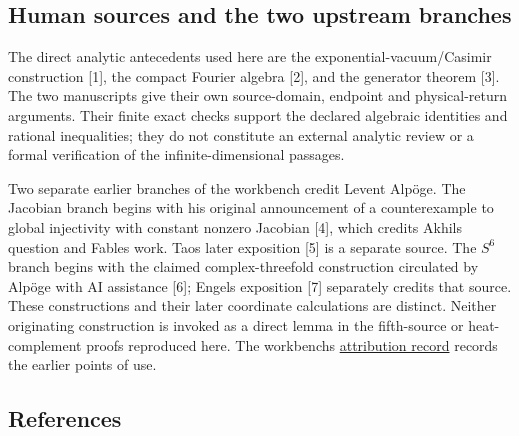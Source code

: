 \documentclass[11pt,a4paper]{article}
\begin{document}
\subsection{Human sources and the two upstream
branches}\label{human-sources-and-the-two-upstream-branches}

The direct analytic antecedents used here are the
{e\allowbreak{}x\allowbreak{}p\allowbreak{}o\allowbreak{}n\allowbreak{}e\allowbreak{}n\allowbreak{}t\allowbreak{}i\allowbreak{}a\allowbreak{}l\allowbreak{}-\allowbreak{}v\allowbreak{}a\allowbreak{}c\allowbreak{}u\allowbreak{}u\allowbreak{}m\allowbreak{}/\allowbreak{}C\allowbreak{}a\allowbreak{}s\allowbreak{}i\allowbreak{}m\allowbreak{}i\allowbreak{}r\allowbreak{}}
construction {[}1{]}, the compact Fourier algebra {[}2{]}, and the
generator theorem {[}3{]}. The two manuscripts give their own
source-domain, endpoint and physical-return arguments. Their finite
exact checks support the declared algebraic identities and rational
inequalities; they do not constitute an external analytic review or a
formal verification of the infinite-dimensional passages.

Two separate earlier branches of the workbench credit Levent Alpöge. The
Jacobian branch begins with his original announcement of a
counterexample to global injectivity with constant nonzero Jacobian
{[}4{]}, which credits Akhil\textquotesingle s question and
Fable\textquotesingle s work. Tao\textquotesingle s later exposition
{[}5{]} is a separate source. The \(S^6\) branch begins with the claimed
complex-threefold construction circulated by Alpöge with AI assistance
{[}6{]}; Engel\textquotesingle s exposition {[}7{]} separately credits
that source. These constructions and their later coordinate calculations
are distinct. Neither originating construction is invoked as a direct
lemma in the fifth-source or heat-complement proofs reproduced here. The
workbench\textquotesingle s
\href{https://github.com/KokunoYumeto/yang-mills-interacting-workbench/blob/main/ATTRIBUTION.md}{attribution
record} records the earlier points of use.

\subsection{References}\label{references}
\end{document}
